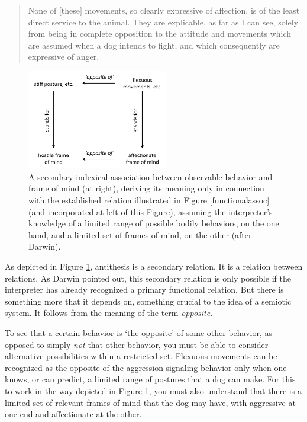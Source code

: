 \begin{quotation}
None of $[$these$]$ movements, so clearly expressive of 
affection, is of the least direct service to the animal. They are 
explicable, as far as I can see, solely from being in complete 
opposition to the attitude and movements which are assumed when a dog 
intends to fight, and which consequently are expressive of anger. 
\citep[15--16]{darwin_expression_1872} 
\end{quotation}


\begin{figure}[h]
\includegraphics[width=0.55\textwidth,keepaspectratio]{figures/Fig04}
\caption{A secondary indexical association between observable behavior 
and frame of mind (at right), deriving its meaning only in connection 
with the established relation illustrated in Figure \ref{functionalassoc} (and incorporated 
at left of this Figure), assuming the interpreter's knowledge of a 
limited range of possible bodily behaviors, on the one hand, and a 
limited set of frames of mind, on the other (after Darwin).}
\label{secondaryassoc}
\end{figure}

As depicted in Figure \ref{secondaryassoc}, antithesis is a secondary relation. It is a relation between relations. As Darwin 
pointed out, this secondary relation is only possible if the interpreter has already recognized a primary functional relation. But there is something 
more that it depends on, something crucial to the idea of a semiotic 
system. It follows from the meaning of the term \textit{opposite}. 



To see that a certain behavior is `the opposite' of some 
other behavior, as opposed to simply \textit{not} that other behavior, 
you must be able to consider alternative possibilities within a 
restricted set. Flexuous movements can be recognized as the opposite of 
the aggression-signaling behavior only when one knows, or can predict, a 
limited range of postures that a dog can make. For this to work in 
the way depicted in Figure \ref{secondaryassoc}, you must also understand that there is a 
limited set of relevant frames of mind that the dog may have, with aggressive at one end and affectionate at the other. 



